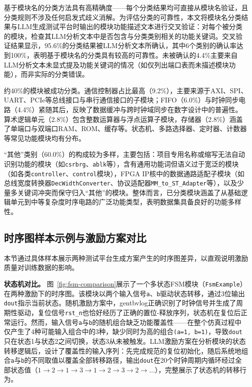 基于模块名的分类方法具有高精确度——每个分类结果均可直接从模块名验证，且分类规则不涉及任何启发式歧义消解。为评估分类的可靠性，本文将模块名分类结果与LLM生成测试平台时输出的模块功能描述文本进行交叉验证：对每个被分类的模块，检查其LLM分析文本中是否包含与分类类别相关的功能关键词。交叉验证结果显示，95.6\%的分类结果被LLM分析文本所确认，其中6个类别的确认率达到100\%，表明基于模块名的分类具有较高的可靠性。未被确认的4.4\%主要来自LLM分析文本未显式提及功能关键词的情况（如仅列出端口表而未描述模块功能），而非实际的分类错误。

约40\%的模块被成功分类。通信控制器占比最高（9.2\%），主要来源于AXI、SPI、UART、PCIe等总线接口与串行通信接口的子模块；FIFO（6.0\%）与时钟同步电路（4.4\%）紧随其后，反映了数据缓冲与跨时钟域同步在数字设计中的普遍性。算术逻辑单元（2.8\%）包含整数运算器与浮点运算子模块，存储器（2.8\%）涵盖了单端口与双端口RAM、ROM、缓存等。状态机、多路选择器、定时器、计数器等常见功能模块均有分布。

“其他”类别（60.0\%）的构成较为多样，主要包括：项目专用名称或缩写无法自动识别功能的模块（如\texttt{csrbrg}、\texttt{ablk}等），含有通用功能词但语义过于宽泛的模块（如各类\texttt{controller}、\texttt{control}模块），FPGA IP核中的数据通路适配子模块（如总线宽度转换器\texttt{DecWidthConverter}、协议适配器\texttt{MM\_to\_ST\_Adapter}等），以及少量多关键词冲突而保守归入“其他”的模块。整体而言，已分类模块涵盖了从基础逻辑单元到中等复杂度时序电路的广泛功能类型，表明数据集具备良好的功能多样性。

\subsection{时序图样本示例与激励方案对比}

本节通过具体样本展示两种测试平台生成方案产生的时序图差异，以直观说明激励质量对训练数据的影响。

\textbf{状态机对比。}%
图~\ref{fig:fsm-comparison}展示了一个多状态FSM模块（\texttt{FsmExample}）在两种激励下的时序图。该模块以两个输入信号\texttt{a}、\texttt{b}驱动状态转移，通过3位输出\texttt{dout}指示当前状态。随机激励方案中，gentbvlog正确识别了时钟信号并生成了周期性驱动，复位信号\texttt{rst\_n}也恰好经历了正确的置位-释放序列，状态机在复位后正常运行。然而，输入信号\texttt{a}与\texttt{b}的随机组合缺乏功能覆盖性——在整个仿真过程中仅产生了4种可能输入组合中的3种，缺少同时为高的组合\texttt{(a=1, b=1)}，导致\texttt{dout}只在状态1与状态2之间切换，状态3从未被触发。LLM激励方案在分析模块的状态转移逻辑后，设计了覆盖性的输入序列：先完成规范的复位初始化，随后系统地组合\texttt{a}与\texttt{b}的不同取值以覆盖全部转移路径，输出\texttt{dout}在20个时钟周期内循环经过全部状态值（$1 \to 2 \to 1 \to 3 \to 1 \to 2 \to 3 \to 2 \to \ldots$），完整展示了状态机的转移行为。

